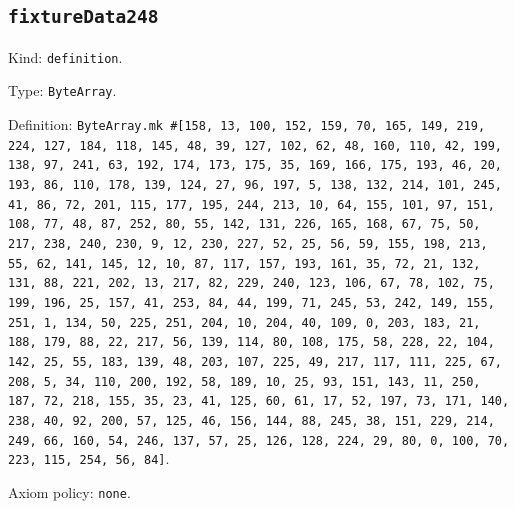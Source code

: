 \documentclass[11pt]{article}
\begin{document}
\subsection*{\texttt{fixtureData248}}
\noindent Kind: \texttt{definition}.\par
\noindent Type: \texttt{ByteArray}.\par
\noindent Definition: \texttt{ByteArray.mk \#[158, 13, 100, 152, 159, 70, 165, 149, 219, 224, 127, 184, 118, 145, 48, 39, 127, 102, 62, 48, 160, 110, 42, 199, 138, 97, 241, 63, 192, 174, 173, 175, 35, 169, 166, 175, 193, 46, 20, 193, 86, 110, 178, 139, 124, 27, 96, 197, 5, 138, 132, 214, 101, 245, 41, 86, 72, 201, 115, 177, 195, 244, 213, 10, 64, 155, 101, 97, 151, 108, 77, 48, 87, 252, 80, 55, 142, 131, 226, 165, 168, 67, 75, 50, 217, 238, 240, 230, 9, 12, 230, 227, 52, 25, 56, 59, 155, 198, 213, 55, 62, 141, 145, 12, 10, 87, 117, 157, 193, 161, 35, 72, 21, 132, 131, 88, 221, 202, 13, 217, 82, 229, 240, 123, 106, 67, 78, 102, 75, 199, 196, 25, 157, 41, 253, 84, 44, 199, 71, 245, 53, 242, 149, 155, 251, 1, 134, 50, 225, 251, 204, 10, 204, 40, 109, 0, 203, 183, 21, 188, 179, 88, 22, 217, 56, 139, 114, 80, 108, 175, 58, 228, 22, 104, 142, 25, 55, 183, 139, 48, 203, 107, 225, 49, 217, 117, 111, 225, 67, 208, 5, 34, 110, 200, 192, 58, 189, 10, 25, 93, 151, 143, 11, 250, 187, 72, 218, 155, 35, 23, 41, 125, 60, 61, 17, 52, 197, 73, 171, 140, 238, 40, 92, 200, 57, 125, 46, 156, 144, 88, 245, 38, 151, 229, 214, 249, 66, 160, 54, 246, 137, 57, 25, 126, 128, 224, 29, 80, 0, 100, 70, 223, 115, 254, 56, 84]}.\par
\noindent Axiom policy: \texttt{none}.\par
\end{document}
